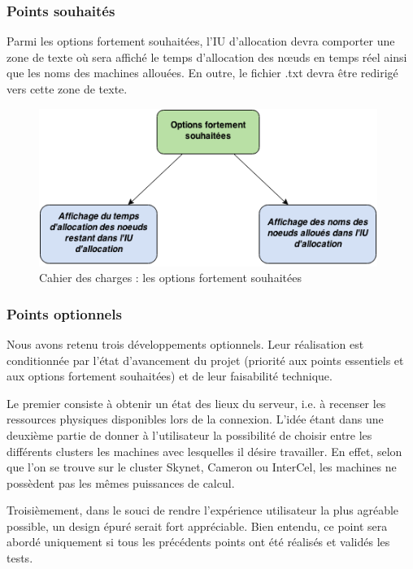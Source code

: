 \subsubsection{Points souhaités}
\label{sec:points-souhaites}

\par Parmi les options fortement souhaitées, l’IU d’allocation devra comporter une zone de texte où sera affiché le temps d’allocation des nœuds en temps réel ainsi que les noms des machines allouées. En outre, le fichier .txt devra être redirigé vers cette zone de texte.

\begin{figure}[h!]
  \centering
  \includegraphics[width=11cm]{images/points_souhaites.png}
  \caption{Cahier des charges : les options fortement souhaitées}
  \label{fig:pts_souhaites}
\end{figure}

\subsubsection{Points optionnels}
\label{sec:points-optionnels}

\par Nous avons retenu trois développements optionnels. Leur réalisation est conditionnée par l’état d’avancement du projet (priorité aux points essentiels et aux options fortement souhaitées) et de leur faisabilité technique.
\par Le premier consiste à obtenir un état des lieux du serveur, i.e. à recenser les ressources physiques disponibles lors de la connexion. L’idée étant dans une deuxième partie de donner à l’utilisateur la possibilité de choisir entre les différents clusters les machines avec lesquelles il désire travailler. En effet, selon que l’on se trouve sur le cluster Skynet, Cameron ou InterCel, les machines ne possèdent pas les mêmes puissances de calcul.
\par Troisièmement, dans le souci de rendre l’expérience utilisateur la plus agréable possible, un design épuré serait fort appréciable. Bien entendu, ce point sera abordé uniquement si tous les précédents points ont été réalisés et validés les tests.

